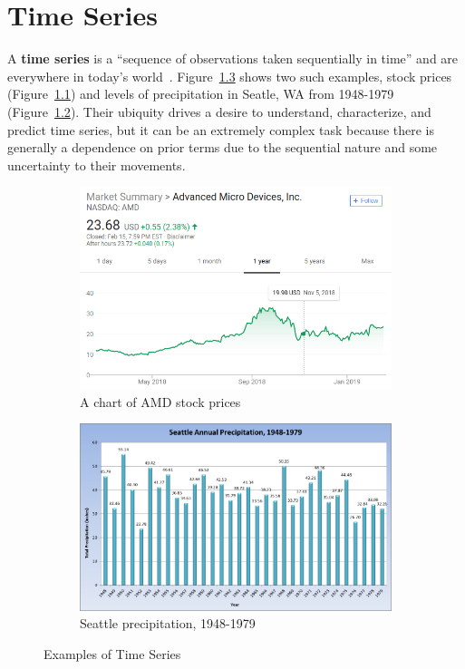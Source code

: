 \documentclass[oneside,12pt,openany]{book}
\begin{document}
	\chapter{Time Series}
	
	A \textbf{time series} is a ``sequence of observations taken sequentially in time'' and are everywhere in today's world~\cite{Box}. Figure~\ref{fig:TimeSeriesExamples} shows two such examples, stock prices (Figure~\ref{fig:AMDChart}) and levels of precipitation in Seatle, WA from 1948-1979 (Figure~\ref{fig:SeattlePrecip}). Their ubiquity drives a desire to understand, characterize, and predict time series, but it can be an extremely complex task because there is generally a dependence on prior terms due to the sequential nature and some uncertainty to their movements.
	
	\begin{figure}[hbt!]
		\centering
		\begin{subfigure}[b]{.45\textwidth}
			\includegraphics[width=\textwidth]{images/AMDChart.png}
			\caption{A chart of AMD stock prices}
			\label{fig:AMDChart}
		\end{subfigure}
		\begin{subfigure}[b]{.45\textwidth}
			\includegraphics[width=\textwidth]{images/SeattleRainfall.png}
			\caption{Seattle precipitation, 1948-1979}
			\label{fig:SeattlePrecip}
		\end{subfigure}
		\caption[Examples of Time Series]{Examples of Time Series \footnotemark}
		\label{fig:TimeSeriesExamples}
			
	\end{figure}
\end{document}
